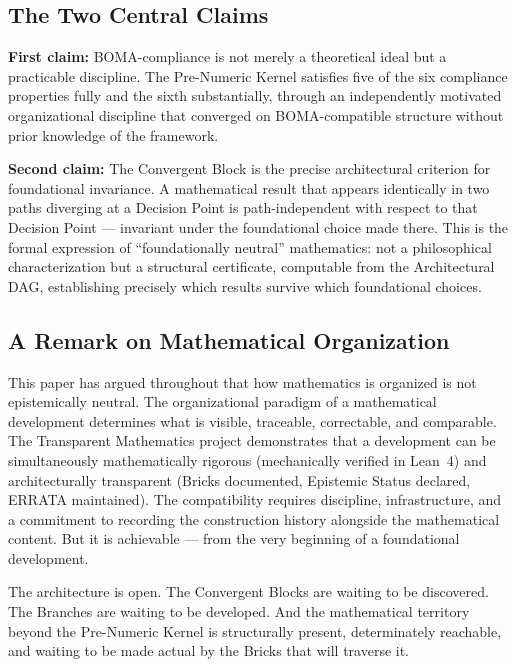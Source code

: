 \documentclass[12pt, a4paper]{article}
\theoremstyle{plain}
\theoremstyle{definition}
\theoremstyle{remark}
\newcommand{\BOMA}{\textsf{BOMA}}
\begin{document}
\subsection{The Two Central Claims}
\label{subsec:conc-claims}

\textbf{First claim:} \BOMA{}-compliance is not merely a theoretical
ideal but a practicable discipline. The Pre-Numeric Kernel satisfies
five of the six compliance properties fully and the sixth
substantially, through an independently motivated organizational
discipline that converged on \BOMA{}-compatible structure without
prior knowledge of the framework.

\textbf{Second claim:} The Convergent Block is the precise
architectural criterion for foundational invariance. A mathematical
result that appears identically in two paths diverging at a Decision
Point is path-independent with respect to that Decision Point ---
invariant under the foundational choice made there. This is the
formal expression of ``foundationally neutral'' mathematics: not a
philosophical characterization but a structural certificate,
computable from the Architectural DAG, establishing precisely which
results survive which foundational choices.

\subsection{A Remark on Mathematical Organization}
\label{subsec:conc-remark}

This paper has argued throughout that how mathematics is organized is
not epistemically neutral. The organizational paradigm of a
mathematical development determines what is visible, traceable,
correctable, and comparable. The Transparent Mathematics project
demonstrates that a development can be simultaneously mathematically
rigorous (mechanically verified in Lean~4) and architecturally
transparent (Bricks documented, Epistemic Status declared, ERRATA
maintained). The compatibility requires discipline, infrastructure,
and a commitment to recording the construction history alongside the
mathematical content. But it is achievable --- from the very
beginning of a foundational development.

The architecture is open. The Convergent Blocks are waiting to be
discovered. The Branches are waiting to be developed. And the
mathematical territory beyond the Pre-Numeric Kernel is structurally
present, determinately reachable, and waiting to be made actual by
the Bricks that will traverse it.


\newpage
\printbibliography

\end{document}
